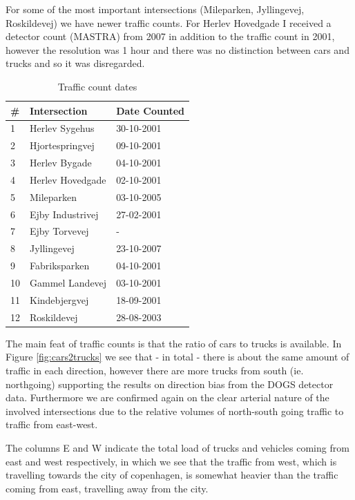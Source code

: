 For some of the most important intersections (Mileparken, Jyllingevej, Roskildevej) we have newer traffic counts. For Herlev Hovedgade I received a detector count (MASTRA) from 2007 in addition to the traffic count in 2001, however the resolution was 1 hour and there was no distinction between cars and trucks and so it was disregarded.

\begin{table}[!ht]
\centering
\begin{tabular}{l|l|l}
\textbf{\#} & \textbf{Intersection} & \textbf{Date Counted}\\ \hline
1 & Herlev Sygehus & 30-10-2001\\
2 & Hjortespringvej & 09-10-2001\\
3 & Herlev Bygade & 04-10-2001\\
4 & Herlev Hovedgade & 02-10-2001\\
5 & Mileparken & 03-10-2005\\
6 & Ejby Industrivej & 27-02-2001\\
7 & Ejby Torvevej & -\\
8 & Jyllingevej & 23-10-2007\\
9 & Fabriksparken & 04-10-2001\\
10 & Gammel Landevej & 03-10-2001\\
11 & Kindebjergvej & 18-09-2001\\
12 & Roskildevej & 28-08-2003\\
\end{tabular}
\caption{Traffic count dates}
\label{tab:traffic_counts}
\end{table}

The main feat of traffic counts is that the ratio of cars to trucks is available. In Figure \ref{fig:cars2trucks} we see that - in total - there is about the same amount of traffic in each direction, however there are more trucks from south (ie. northgoing) supporting the results on direction bias from the DOGS detector data. Furthermore we are confirmed again on the clear arterial nature of the involved intersections due to the relative volumes of north-south going traffic to traffic from east-west.

The columns E and W indicate the total load of trucks and vehicles coming from east and west respectively, in which we see that the traffic from west, which is travelling towards the city of copenhagen, is somewhat heavier than the traffic coming from east, travelling away from the city.

